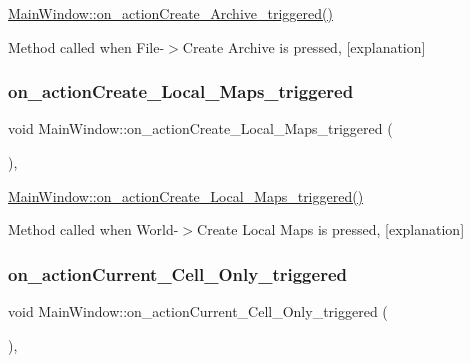 \hyperlink{class_main_window_a6ac0bcf0b051abe049c84075e0a5d13a}{Main\+Window\+::on\+\_\+action\+Create\+\_\+\+Archive\+\_\+triggered()} 

Method called when File-\/$>$Create Archive is pressed, \mbox{[}explanation\mbox{]} \mbox{\label{class_main_window_a8ef4f1be069a5526d6d5f1aced12b5c3}} 
\subsubsection{\texorpdfstring{on\+\_\+action\+Create\+\_\+\+Local\+\_\+\+Maps\+\_\+triggered}{on\_actionCreate\_Local\_Maps\_triggered}}
{\footnotesize\ttfamily void Main\+Window\+::on\+\_\+action\+Create\+\_\+\+Local\+\_\+\+Maps\+\_\+triggered (\begin{DoxyParamCaption}{ }\end{DoxyParamCaption})\hspace{0.3cm}{\ttfamily [private]}, {\ttfamily [slot]}}



\hyperlink{class_main_window_a8ef4f1be069a5526d6d5f1aced12b5c3}{Main\+Window\+::on\+\_\+action\+Create\+\_\+\+Local\+\_\+\+Maps\+\_\+triggered()} 

Method called when World-\/$>$Create Local Maps is pressed, \mbox{[}explanation\mbox{]} \mbox{\label{class_main_window_a58acaabf35d71b094d373c5a8f4f333a}} 
\subsubsection{\texorpdfstring{on\+\_\+action\+Current\+\_\+\+Cell\+\_\+\+Only\+\_\+triggered}{on\_actionCurrent\_Cell\_Only\_triggered}}
{\footnotesize\ttfamily void Main\+Window\+::on\+\_\+action\+Current\+\_\+\+Cell\+\_\+\+Only\+\_\+triggered (\begin{DoxyParamCaption}{ }\end{DoxyParamCaption})\hspace{0.3cm}{\ttfamily [private]}, {\ttfamily [slot]}}



